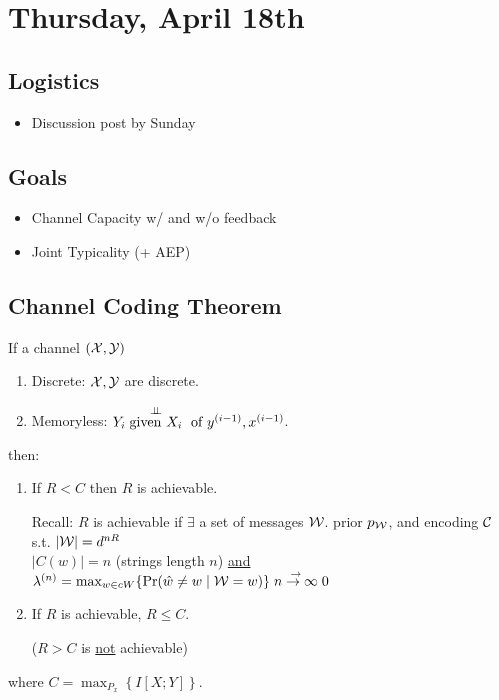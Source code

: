 \section{Thursday, April 18th}
\subsection{Logistics}
\begin{itemize}
    \item Discussion post by Sunday
\end{itemize}

\subsection{Goals}
\begin{itemize}
    \item Channel Capacity w/ and w/o feedback
    \item Joint Typicality (+ AEP)
\end{itemize}

\subsection{Channel Coding Theorem}
If a channel $(\mathcal{X}, \mathcal{Y})$
\begin{enumerate}
    \item Discrete: $\mathcal{X}, \mathcal{Y}$ are discrete.
    \item Memoryless: $Y_i\stackrel{\mathrel{\perp\!\!\!\perp}}{\text{given } X_i} \text{ of } y^{(i-1)}, x^{(i-1)}$.
\end{enumerate}
then:
\begin{enumerate}
    \item If $R < C$ then $R$ is achievable.
    \begin{shaded}
        Recall: $R$ is achievable if $\exists$ a set of messages $\mathcal{W}$. prior $p_{\mathcal{W}}$, and encoding $\mathcal{C}$ s.t. $|\mathcal{W}|=d^{nR}$\\
        $|C(w)|=n$ (strings length $n$) \underline{and} $\lambda^{(n)}=\max_{w\in
        cW}\{\Pr(\hat{w}\neq w\mid \mathcal{W} = w)\}\stackrel{\to}{n\to\infty}0$
    \end{shaded}
    \item If $R$ is achievable, $R\leq C$. 
    \begin{shaded}
        ($R>C$ is \underline{not} achievable)
    \end{shaded}
\end{enumerate}
where $C=\max_{P_x}\left\{I[X; Y]\right\}$.


